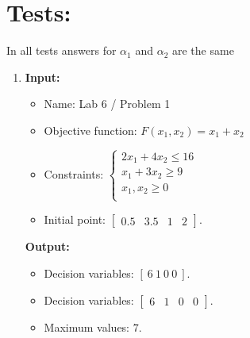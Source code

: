 \documentclass{article}
\begin{document}
\newpage

\section*{Tests:}

In all tests answers for \(\alpha_1\) and \(\alpha_2\) are the same

\begin{enumerate}[label={(\arabic*)}, itemsep=0.25in]
    \item \textbf{Input:}
          \begin{itemize}
              \item Name: Lab 6 / Problem 1
              \item Objective function: \(F(x_1, x_2) = x_1 + x_2\)
              \item Constraints: \(\begin{cases}
                        2 x_1 + 4 x_2 \le 16 \\
                        x_1 + 3 x_2 \ge 9    \\
                        x_1 , x_2 \ge 0      \\
                    \end{cases}\)
          \end{itemize}
          \begin{itemize}
              \item Initial point: \(\begin{bmatrix} 0.5 & 3.5 & 1 & 2 \end{bmatrix}\).
          \end{itemize}
          \textbf{Output:}
          \begin{itemize}
              \item Decision variables: \([ \ 6 \ 1 \ 0 \ 0 \ ]\).
              \item Decision variables: \(\begin{bmatrix} 6 & 1 & 0 & 0 \end{bmatrix}\).
              \item Maximum values:  \(7\).
          \end{itemize}


\end{enumerate}
\end{document}
